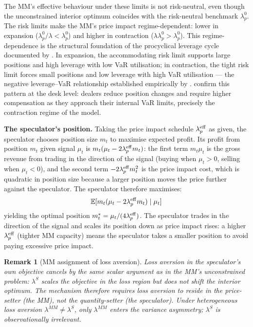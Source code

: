 \documentclass[12pt,a4paper]{article}
\newtheorem{remark}[theorem]{Remark}
\theoremstyle{definition}
\begin{document}
The MM's effective behaviour under these limits is not risk-neutral,
even though the unconstrained interior optimum coincides with the
risk-neutral benchmark $\lambda^0_p$. The risk limits make the MM's
price impact regime-dependent: lower in expansion
($\lambda^0_p/\lambda < \lambda^0_p$) and higher in contraction
($\lambda\lambda^0_p > \lambda^0_p$). This regime-dependence is the
structural foundation of the procyclical leverage cycle documented by
\citet{adrian2010,adrian2014}. In expansion, the accommodating risk
limit supports large positions and high leverage with low VaR
utilisation; in contraction, the tight risk limit forces small positions
and low leverage with high VaR utilisation --- the negative
leverage--VaR relationship established empirically by \citet{adrian2014}.
\citet{li2025} confirm this pattern at the desk level: dealers reduce
position changes and require higher compensation as they approach their
internal VaR limits, precisely the contraction regime of the model.

\noindent\textbf{The speculator's position.}
Taking the price impact schedule $\lambda^{\rm eff}_p$ as given, the
speculator chooses position size $m_t$ to maximise expected profit. Its
profit from position $m_t$ given signal $\mu_t$ is $m_t(\mu_t -
2\lambda^{\rm eff}_p m_t)$: the first term $m_t\mu_t$ is the gross
revenue from trading in the direction of the signal (buying when $\mu_t
> 0$, selling when $\mu_t < 0$), and the second term $-2\lambda^{\rm
eff}_p m^2_t$ is the price impact cost, which is quadratic in position
size because a larger position moves the price further against the
speculator. The speculator therefore maximises:
\[
  \mathbb{E}[m_t(\mu_t - 2\lambda^{\rm eff}_p m_t) \mid \mu_t]
\]
yielding the optimal position $m^*_t = \mu_t / (4\lambda^{\rm eff}_p)$.
The speculator trades in the direction of the signal and scales its
position down as price impact rises: a higher $\lambda^{\rm eff}_p$
(tighter MM capacity) means the speculator takes a smaller position to
avoid paying excessive price impact.

\begin{remark}[MM assignment of loss aversion]
\label{rem:mm_assignment}
Loss aversion in the speculator's own objective cancels by the same
scalar argument as in the MM's unconstrained problem: $\lambda^S$
scales the objective in the loss region but does not shift the interior
optimum. The mechanism therefore requires loss aversion to reside in the
price-setter (the MM), not the quantity-setter (the speculator). Under
heterogeneous loss aversion $\lambda^{MM} \neq \lambda^S$, only
$\lambda^{MM}$ enters the variance asymmetry; $\lambda^S$ is
observationally irrelevant.
\end{remark}
\end{document}
